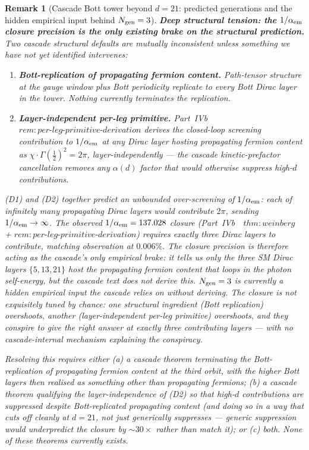 \documentclass[12pt,a4paper]{article}
\newtheorem{remark}[theorem]{Remark}
\begin{document}
\begin{remark}[Cascade Bott tower beyond $d=21$: predicted generations and the hidden empirical input behind $N_{\rm gen}=3$]
\medskip\noindent\textbf{Deep structural tension: the $1/\alpha_{\rm em}$ closure precision is the only existing brake on the structural prediction.} Two cascade structural defaults are mutually inconsistent unless something we have not yet identified intervenes:
\begin{enumerate}[label=(D\arabic*),nosep]
\item \textbf{Bott-replication of propagating fermion content.} Path-tensor structure at the gauge window plus Bott periodicity replicate to every Bott Dirac layer in the tower. Nothing currently terminates the replication.
\item \textbf{Layer-independent per-leg primitive.} Part~IVb~\cite{part4b}~$\mathit{rem{:}per\text{-}leg\text{-}primitive\text{-}derivation}$ derives the closed-loop screening contribution to $1/\alpha_{\rm em}$ at any Dirac layer hosting propagating fermion content as $\chi\cdot\Gamma(\tfrac{1}{2})^2 = 2\pi$, layer-independently --- the cascade kinetic-prefactor cancellation removes any $\alpha(d)$ factor that would otherwise suppress high-$d$ contributions.
\end{enumerate}
(D1) and (D2) together predict an unbounded over-screening of $1/\alpha_{\rm em}$: each of infinitely many propagating Dirac layers would contribute $2\pi$, sending $1/\alpha_{\rm em}\to\infty$. The observed $1/\alpha_{\rm em}=137.028$ closure (Part~IVb~\cite{part4b}~$\mathit{thm{:}weinberg}$ + $\mathit{rem{:}per\text{-}leg\text{-}primitive\text{-}derivation}$) requires \emph{exactly three} Dirac layers to contribute, matching observation at $0.006\%$. The closure precision is therefore acting as the cascade's only empirical brake: it tells us only the three SM Dirac layers $\{5,13,21\}$ host the propagating fermion content that loops in the photon self-energy, but the cascade text does not derive this. \emph{$N_{\rm gen}=3$ is currently a hidden empirical input the cascade relies on without deriving.} The closure is not exquisitely tuned by chance: one structural ingredient (Bott replication) overshoots, another (layer-independent per-leg primitive) overshoots, and they conspire to give the right answer at exactly three contributing layers --- with no cascade-internal mechanism explaining the conspiracy.

Resolving this requires either (a) a cascade theorem terminating the Bott-replication of propagating fermion content at the third orbit, with the higher Bott layers then realised as something other than propagating fermions; (b) a cascade theorem qualifying the layer-independence of (D2) so that high-$d$ contributions are suppressed despite Bott-replicated propagating content (and doing so in a way that cuts off cleanly at $d=21$, not just generically suppresses --- generic suppression would underpredict the closure by $\sim 30\times$ rather than match it); or (c) both. None of these theorems currently exists.


\end{remark}
\end{document}
